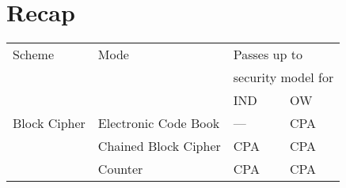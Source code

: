 \chapter{Recap}

	\begin{table}[htp!]
		\centering
		\begin{tabular}{llll}
			\toprule
			Scheme & Mode & \multicolumn{2}{l}{Passes up to}\\
			&& \multicolumn{2}{l}{security model for}\\\cmidrule(r){3-4}
			&& IND & OW\\\midrule
			Block Cipher & Electronic Code Book & --- & CPA\\
			& Chained Block Cipher & CPA & CPA\\
			& Counter & CPA & CPA\\
			\bottomrule
		\end{tabular}
	\end{table}